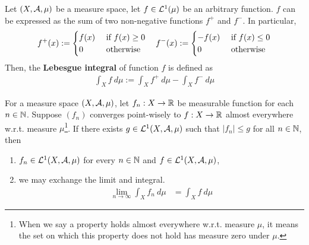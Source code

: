 \documentclass[11pt]{article}
\numberwithin{equation}{section}
\begin{document}
	\begin{definition}
	    Let $(X, \mathcal{{A}}, \mu)$ be a measure space, let $f \in \mathcal{{L}}^1(\mu)$ be an arbitrary function. $f$ can be expressed as the sum of two non-negative functions $f^+$ and $f^-$.
	    In particular,
	    \begin{align}
	        f^+(x) := \begin{cases}
	            f(x) &\text{{ if }} f(x) \geq 0 \\
	            0 &\text{{ otherwise}}
	        \end{cases}\quad
	        f^-(x) := \begin{cases}
	            -f(x) &\text{{ if }} f(x) \leq 0 \\
	            0 &\text{{ otherwise}}
	        \end{cases}
	    \end{align}
	    Then, the \textbf{Lebesgue integral} of function $f$ is defined as
	    \begin{align}
	        \int_X f\ d\mu := \int_X f^+\ d\mu - \int_X f^-\ d\mu
	    \end{align}
	\end{definition}
	
	\begin{theorem}
        For a measure space $(X, \mathcal{{A}}, \mu)$, let $f_n: X \to \mathbb{R}$ be measurable function for each $n \in \mathbb{N}$.
        Suppose $(f_n)$ converges point-wisely to $f: X \to \mathbb{R}$ almost everywhere w.r.t. measure $\mu$\footnote{When we say a property holds almost everywhere w.r.t. measure $\mu$, it means the set on which this property does not hold has measure zero under $\mu$.}.
        If there exists $g \in \mathcal{{L}}^1(X, \mathcal{{A}}, \mu)$ such that $|f_n| \leq g$ for all $n \in \mathbb{N}$, then
        \begin{enumerate}
            \item $f_n \in \mathcal{{L}}^1(X, \mathcal{{A}}, \mu)$ for every $n \in \mathbb{N}$ and $f \in \mathcal{{L}}^1(X, \mathcal{{A}}, \mu)$,
            \item we may exchange the limit and integral.
            \begin{align}
                \lim_{n \to \infty} \int_X f_n\ d\mu &= \int_X f\ d\mu
            \end{align}
        \end{enumerate}
	\end{theorem}
	
\end{document}
